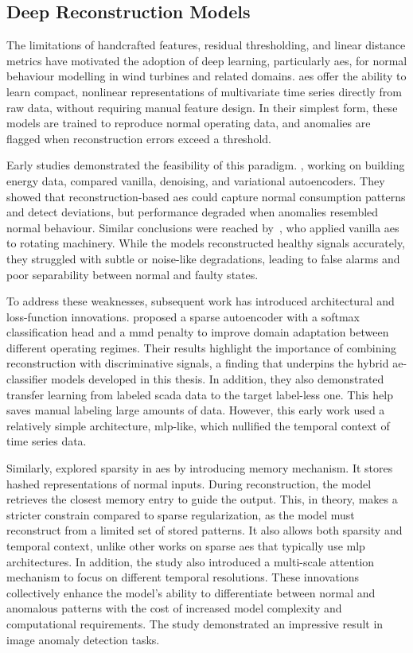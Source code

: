 \subsection{Deep Reconstruction Models}
\label{subsec:deep-reconstruction-models}
The limitations of handcrafted features, residual thresholding, and linear distance metrics have motivated the adoption of deep learning, particularly \glspl{ae}, for normal behaviour modelling in wind turbines and related domains. 
\glspl{ae} offer the ability to learn compact, nonlinear representations of multivariate time series directly from raw data, without requiring manual feature design. 
In their simplest form, these models are trained to reproduce normal operating data, and anomalies are flagged when reconstruction errors exceed a threshold.

Early studies demonstrated the feasibility of this paradigm.
\cite{fan_analytical_2018}, working on building energy data, compared vanilla, denoising, and variational autoencoders.
They showed that reconstruction-based \glspl{ae} could capture normal consumption patterns and detect deviations, but performance degraded when anomalies resembled normal behaviour.
Similar conclusions were reached by~\cite{ahmad_autoencoder-based_2020}, who applied vanilla \glspl{ae} to rotating machinery.
While the models reconstructed healthy signals accurately, they struggled with subtle or noise-like degradations, leading to false alarms and poor separability between normal and faulty states.

To address these weaknesses, subsequent work has introduced architectural and loss-function innovations. 
\cite{wen_new_2019} proposed a sparse autoencoder with a softmax classification head and a \gls{mmd} penalty to improve domain adaptation between different operating regimes. 
Their results highlight the importance of combining reconstruction with discriminative signals, a finding that underpins the hybrid \gls{ae}-classifier models developed in this thesis.
In addition, they also demonstrated transfer learning from  labeled \gls{scada} data to the target label-less one.
This help saves manual labeling large amounts of data.
However, this early work used a relatively simple architecture, \gls{mlp}-like, which nullified the temporal context of time series data.

Similarly, \cite{chen_mama_2021} explored sparsity in \glspl{ae} by introducing memory mechanism.
It stores hashed representations of normal inputs.
During reconstruction, the model retrieves the closest memory entry to guide the output.
This, in theory, makes a stricter constrain compared to sparse regularization, as the model must reconstruct from a limited set of stored patterns.
It also allows both sparsity and temporal context, unlike other works on sparse \glspl{ae} that typically use \gls{mlp} architectures.
In addition, the study also introduced a multi-scale attention mechanism to focus on different temporal resolutions.
These innovations collectively enhance the model's ability to differentiate between normal and anomalous patterns with the cost of increased model complexity and computational requirements.
The study demonstrated an impressive result in image anomaly detection tasks.

